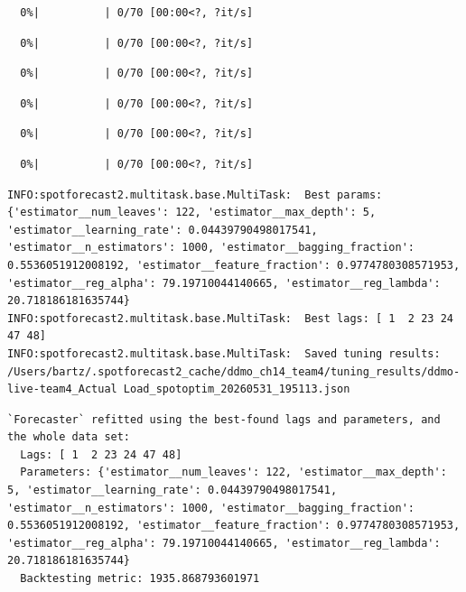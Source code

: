 \documentclass[
  english,
  letterpaper,
]{scrbook}
\begin{document}
\protect{}\label{team4-train-25}
\begin{verbatim}
  0%|          | 0/70 [00:00<?, ?it/s]
\end{verbatim}

\protect{}\label{team4-train-26}
\begin{verbatim}
  0%|          | 0/70 [00:00<?, ?it/s]
\end{verbatim}

\protect{}\label{team4-train-27}
\begin{verbatim}
  0%|          | 0/70 [00:00<?, ?it/s]
\end{verbatim}

\protect{}\label{team4-train-28}
\begin{verbatim}
  0%|          | 0/70 [00:00<?, ?it/s]
\end{verbatim}

\protect{}\label{team4-train-29}
\begin{verbatim}
  0%|          | 0/70 [00:00<?, ?it/s]
\end{verbatim}

\protect{}\label{team4-train-30}
\begin{verbatim}
  0%|          | 0/70 [00:00<?, ?it/s]
\end{verbatim}

\begin{verbatim}
INFO:spotforecast2.multitask.base.MultiTask:  Best params: {'estimator__num_leaves': 122, 'estimator__max_depth': 5, 'estimator__learning_rate': 0.04439790498017541, 'estimator__n_estimators': 1000, 'estimator__bagging_fraction': 0.5536051912008192, 'estimator__feature_fraction': 0.9774780308571953, 'estimator__reg_alpha': 79.19710044140665, 'estimator__reg_lambda': 20.718186181635744}
INFO:spotforecast2.multitask.base.MultiTask:  Best lags: [ 1  2 23 24 47 48]
INFO:spotforecast2.multitask.base.MultiTask:  Saved tuning results: /Users/bartz/.spotforecast2_cache/ddmo_ch14_team4/tuning_results/ddmo-live-team4_Actual Load_spotoptim_20260531_195113.json
\end{verbatim}

\begin{verbatim}
`Forecaster` refitted using the best-found lags and parameters, and the whole data set: 
  Lags: [ 1  2 23 24 47 48] 
  Parameters: {'estimator__num_leaves': 122, 'estimator__max_depth': 5, 'estimator__learning_rate': 0.04439790498017541, 'estimator__n_estimators': 1000, 'estimator__bagging_fraction': 0.5536051912008192, 'estimator__feature_fraction': 0.9774780308571953, 'estimator__reg_alpha': 79.19710044140665, 'estimator__reg_lambda': 20.718186181635744}
  Backtesting metric: 1935.868793601971
\end{verbatim}
\end{document}
